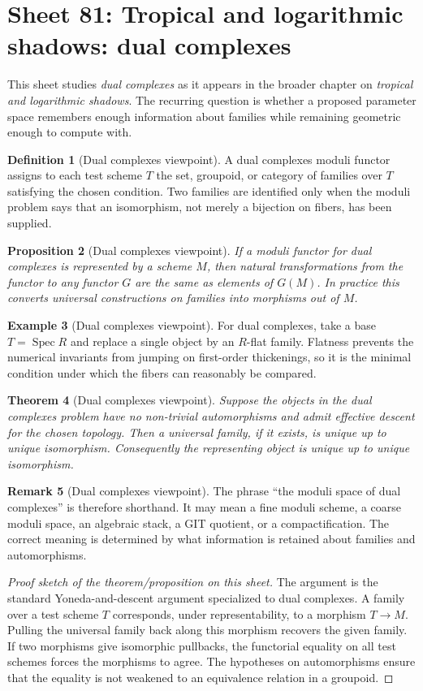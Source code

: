 \documentclass[11pt]{amsart}
\newtheorem{theorem}{Theorem}[section]
\newtheorem{proposition}[theorem]{Proposition}
\theoremstyle{definition}
\newtheorem{definition}[theorem]{Definition}
\newtheorem{example}[theorem]{Example}
\newtheorem{remark}[theorem]{Remark}
\newcommand{\Spec}{\operatorname{Spec}}
\begin{document}
\section{Sheet 81: Tropical and logarithmic shadows: dual complexes}
This sheet studies \emph{dual complexes} as it appears in the broader chapter on \emph{tropical and logarithmic shadows}.  The recurring question is whether a proposed parameter space remembers enough information about families while remaining geometric enough to compute with.
\begin{definition}[Dual complexes viewpoint]
A dual complexes moduli functor assigns to each test scheme $T$ the set, groupoid, or category of families over $T$ satisfying the chosen condition.  Two families are identified only when the moduli problem says that an isomorphism, not merely a bijection on fibers, has been supplied.
\end{definition}
\begin{proposition}[Dual complexes viewpoint]
If a moduli functor for dual complexes is represented by a scheme $M$, then natural transformations from the functor to any functor $G$ are the same as elements of $G(M)$.  In practice this converts universal constructions on families into morphisms out of $M$.
\end{proposition}
\begin{example}[Dual complexes viewpoint]
For dual complexes, take a base $T=\Spec R$ and replace a single object by an $R$-flat family.  Flatness prevents the numerical invariants from jumping on first-order thickenings, so it is the minimal condition under which the fibers can reasonably be compared.
\end{example}
\begin{theorem}[Dual complexes viewpoint]
Suppose the objects in the dual complexes problem have no non-trivial automorphisms and admit effective descent for the chosen topology.  Then a universal family, if it exists, is unique up to unique isomorphism.  Consequently the representing object is unique up to unique isomorphism.
\end{theorem}
\begin{remark}[Dual complexes viewpoint]
The phrase ``the moduli space of dual complexes'' is therefore shorthand.  It may mean a fine moduli scheme, a coarse moduli space, an algebraic stack, a GIT quotient, or a compactification.  The correct meaning is determined by what information is retained about families and automorphisms.
\end{remark}
\begin{proof}[Proof sketch of the theorem/proposition on this sheet]
The argument is the standard Yoneda-and-descent argument specialized to dual complexes.  A family over a test scheme $T$ corresponds, under representability, to a morphism $T\to M$.  Pulling the universal family back along this morphism recovers the given family.  If two morphisms give isomorphic pullbacks, the functorial equality on all test schemes forces the morphisms to agree.  The hypotheses on automorphisms ensure that the equality is not weakened to an equivalence relation in a groupoid.
\end{proof}
\end{document}
